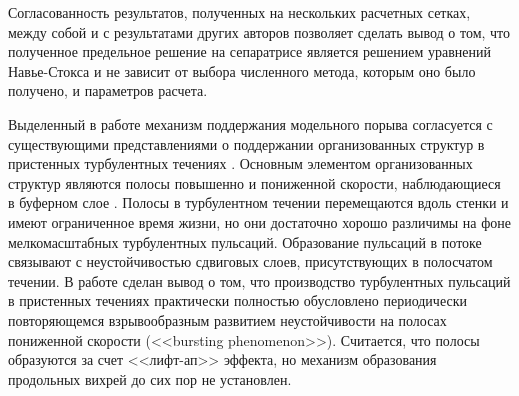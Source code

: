 Согласованность результатов, полученных на нескольких расчетных сетках, между собой и с результатами других авторов позволяет сделать вывод о том, что полученное предельное решение на сепаратрисе является решением уравнений Навье-Стокса и не зависит от выбора численного метода, которым оно было получено, и параметров расчета.

Выделенный в работе механизм поддержания модельного порыва согласуется с существующими представлениями о поддержании организованных структур в пристенных турбулентных течениях \cite{Hamilton1995, Waleffe1995, Waleffe1997, Jimenez1999, Schoppa2002}. Основным элементом организованных структур являются полосы повышенно и пониженной скорости, наблюдающиеся в буферном слое \cite{Kline1967, Smith1983}. Полосы в турбулентном течении перемещаются вдоль стенки и имеют ограниченное время жизни, но они достаточно хорошо различимы на фоне мелкомасштабных турбулентных пульсаций. Образование пульсаций в потоке связывают с неустойчивостью сдвиговых слоев, присутствующих в полосчатом течении. В работе \cite{Kim1971} сделан вывод о том, что производство турбулентных пульсаций в пристенных течениях практически полностью обусловлено периодически повторяющемся взрывообразным развитием неустойчивости на полосах пониженной скорости (<<bursting phenomenon>>). Считается, что полосы образуются за счет <<лифт-ап>> эффекта, но механизм образования продольных вихрей до сих пор не установлен. 



 















